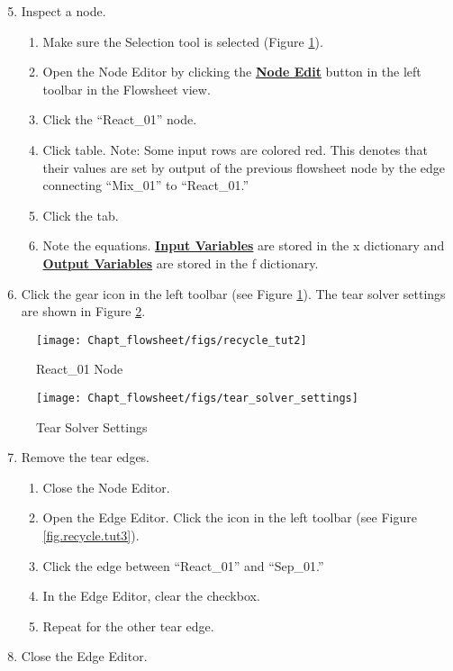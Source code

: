 \begin{enumerate}
	\setcounter{enumi}{4}
	\item Inspect a node.
	\begin{enumerate}
		\item Make sure the Selection tool is selected  (Figure \ref{fig.recycle.tut2}).
		\item Open the Node Editor by clicking the \textbf{\underline{Node Edit}} button in the left toolbar in the Flowsheet view.
		\item Click the ``React\_01'' node.
		\item Click  table. Note: Some input rows are colored red. This denotes that their values are set by output of the previous flowsheet node by the edge connecting ``Mix\_01'' to ``React\_01.''
		\item Click the  tab.
		\item Note the equations. \textbf{\underline{Input Variables}} are stored in the x dictionary and \textbf{\underline{Output Variables}} are stored in the f dictionary.
	\end{enumerate}
	\item Click the gear icon in the left toolbar (see Figure \ref{fig.recycle.tut2}).  The tear solver settings are shown in Figure \ref{fig.tear.settings}.
\end{enumerate}
	
\begin{figure}[H]
	\begin{center}
		\texttt{[image: Chapt\_flowsheet/figs/recycle\_tut2]}
		\caption{React\_01 Node}
		\label{fig.recycle.tut2}
	\end{center}
\end{figure}

\begin{figure}[H]
	\begin{center}
		\texttt{[image: Chapt\_flowsheet/figs/tear\_solver\_settings]}
		\caption{Tear Solver Settings}
		\label{fig.tear.settings}
	\end{center}
\end{figure}

\begin{samepage}
\begin{enumerate}
	\setcounter{enumi}{6}
	\item Remove the tear edges.
	\begin{enumerate}
		\item Close the Node Editor.
		\item Open the Edge Editor. Click the  icon in the left toolbar (see Figure \ref{fig.recycle.tut3}).
		\item Click the edge between ``React\_01'' and ``Sep\_01.''
		\item In the Edge Editor, clear the  checkbox.
		\item Repeat for the other tear edge.
	\end{enumerate}
	\item Close the Edge Editor.
\end{enumerate}
\end{samepage}

